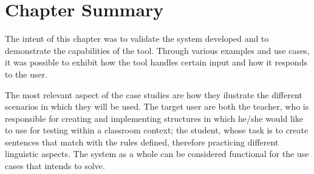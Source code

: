 \section{Chapter Summary}

The intent of this chapter was to validate the system developed and to demonstrate the capabilities of the tool.
Through various examples and use cases, it was possible to exhibit how the tool handles certain input and how it responds to the user.

The most relevant aspect of the case studies are how they ilustrate the different scenarios in which they will be used.
The target user are both the teacher, who is responsible for creating and implementing structures in which he/she would like to use for testing within a classroom context;
the student, whose task is to create sentences that match with the rules defined, therefore practicing different linguistic aspects.
The system as a whole can be considered functional for the use cases that intends to solve.

